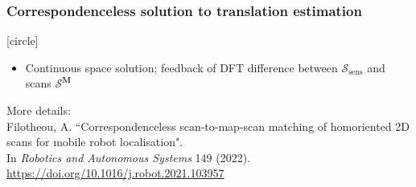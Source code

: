 \begin{frame}[noframenumbering]

  \frametitle{Correspondenceless solution to translation estimation}

  \vspace{0.1cm}
  [circle]
  \begin{itemize}
    \item Continuous space solution; feedback of DFT difference between $\mathcal{S}_{\text{sens}}$ and scans $\mathcal{S}^{\bm{M}}$
  \end{itemize}
  \vspace{-0.25cm}

  \begin{center}
  \end{center}

  \vfill
  {\tiny
  More details: \\
  Filotheou, A. ``Correspondenceless scan-to-map-scan matching of homoriented 2D scans for mobile robot localisation". \\\vspace{-0.25cm}
  In \textit{Robotics and Autonomous Systems} 149 (2022). \url{https://doi.org/10.1016/j.robot.2021.103957}}

\end{frame}
